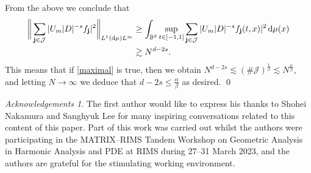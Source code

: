 \documentclass[a4paper]{amsart}
\numberwithin{equation}{section}%
\theoremstyle{plain}%
\theoremstyle{definition}
\theoremstyle{remark}%
\newtheorem*{Acknowledgements}{Acknowledgements}
\def\d{\mathrm{d}}
\newcommand{\J}{\mathcal{J}}
\begin{document}
From the above we conclude that
\begin{align*}
    \bigg\|\sum_{{\bf{j}} \in \J}|U_m |D|^{-s}f_{\bf{j}}|^2\bigg\|_{L^1(\d\mu)L^\infty}
    &\geq
    \int_{\mathbb{B}^d} \sup_{t\in [-1,1]}\sum_{{\bf{j}}\in \J}|U_m |D|^{-s}f_{\bf{j}}(t,x)|^2\,\d\mu(x)\\
    &\gtrsim
    N^{d-2s}.
\end{align*}
This means that if \eqref{maximal} is true, then  we obtain $N^{d-2s}\lesssim (\#\J)^\frac1\beta \lesssim N^\frac\alpha\beta$, and letting $N \to \infty$ we deduce that $d-2s \leq \frac{\alpha}{\beta}$ as desired. \qed




\begin{Acknowledgements}
The first author would like to express his thanks to Shohei Nakamura and Sanghyuk Lee for many inspiring conversations related to this content of this paper. Part of this work was carried out whilst the authors were participating in the MATRIX--RIMS Tandem Workshop on Geometric Analysis in Harmonic Analysis and PDE at RIMS during 27--31 March 2023, and the authors are grateful for the stimulating working environment.
\end{Acknowledgements}










\end{document}
